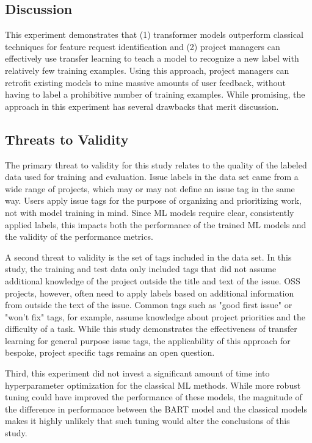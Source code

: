 \subsection{Discussion}

This experiment demonstrates that (1) transformer models outperform classical techniques for feature request identification and (2) project managers can effectively use transfer learning to teach a model to recognize a new label with relatively few training examples. Using this approach, project managers can retrofit existing models to mine massive amounts of user feedback, without having to label a prohibitive number of training examples. While promising, the approach in this experiment has several drawbacks that merit discussion.

\subsection{Threats to Validity}

The primary threat to validity for this study relates to the quality of the labeled data used for training and evaluation. Issue labels in the data set came from a wide range of projects, which may or may not define an issue tag in the same way. Users apply issue tags for the purpose of organizing and prioritizing work, not with model training in mind. Since ML models require clear, consistently applied labels, this impacts both the performance of the trained ML models and the validity of the performance metrics.

A second threat to validity is the set of tags included in the data set. In this study, the training and test data only included tags that did not assume additional knowledge of the project outside the title and text of the issue. OSS projects, however, often need to apply labels based on additional information from outside the text of the issue. Common tags such as "good first issue" or "won't fix" tags, for example, assume knowledge about project priorities and the difficulty of a task. While this study demonstrates the effectiveness of transfer learning for general purpose issue tags, the applicability of this approach for bespoke, project specific tags remains an open question. 

Third, this experiment did not invest a significant amount of time into hyperparameter optimization for the classical ML methods. While more robust tuning could have improved the performance of these models, the magnitude of the difference in performance between the BART model and the classical models makes it highly unlikely that such tuning would alter the conclusions of this study. 

